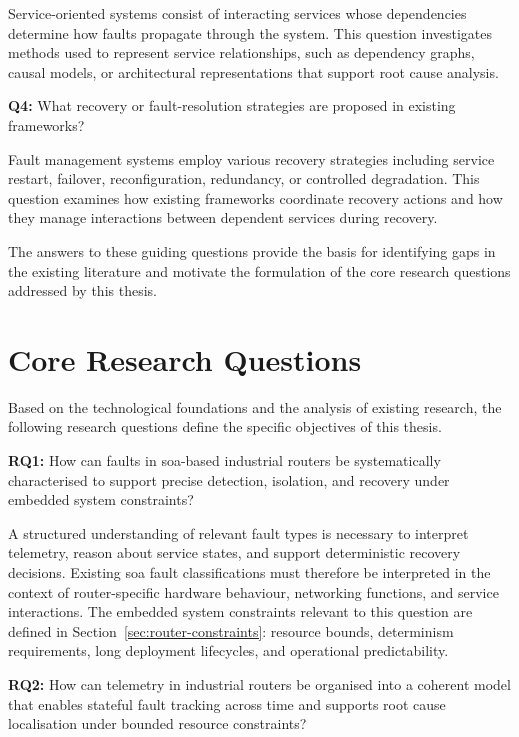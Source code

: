 Service-oriented systems consist of interacting services whose dependencies determine how faults propagate through the system. This question investigates methods used to represent service relationships, such as dependency graphs, causal models, or architectural representations that support root cause analysis.

\textbf{Q4:} What recovery or fault-resolution strategies are proposed in existing frameworks?

Fault management systems employ various recovery strategies including service restart, failover, reconfiguration, redundancy, or controlled degradation. This question examines how existing frameworks coordinate recovery actions and how they manage interactions between dependent services during recovery.

The answers to these guiding questions provide the basis for identifying gaps in the existing literature and motivate the formulation of the core research questions addressed by this thesis.

\section{Core Research Questions}\label{sec:research-questions}

Based on the technological foundations and the analysis of existing research, the following research questions define the specific objectives of this thesis.

\textbf{RQ1:} How can faults in \gls{soa}-based industrial routers be systematically characterised to support precise detection, isolation, and recovery under embedded system constraints?

A structured understanding of relevant fault types is necessary to interpret telemetry, reason about service states, and support deterministic recovery decisions. Existing \gls{soa} fault classifications must therefore be interpreted in the context of router-specific hardware behaviour, networking functions, and service interactions. The embedded system constraints relevant to this question are defined in Section~\ref{sec:router-constraints}: resource bounds, determinism requirements, long deployment lifecycles, and operational predictability.

\textbf{RQ2:} How can telemetry in industrial routers be organised into a coherent model that enables stateful fault tracking across time and supports root cause localisation under bounded resource constraints?

